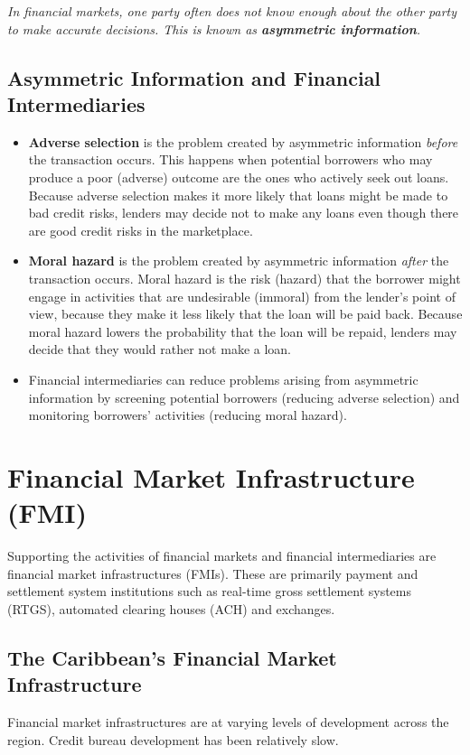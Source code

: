 \textit{In financial markets, one party often does not know enough about the other party to make accurate decisions. This is known as \textbf{asymmetric information}.}

\subsection{Asymmetric Information and Financial Intermediaries}
\begin{itemize}
    \item \textbf{Adverse selection} is the problem created by asymmetric information \emph{before} the transaction occurs. This happens when potential borrowers who may produce a poor (adverse) outcome are the ones who actively seek out loans. Because adverse selection makes it more likely that loans might be made to bad credit risks, lenders may decide not to make any loans even though there are good credit risks in the marketplace.
    \item \textbf{Moral hazard} is the problem created by asymmetric information \emph{after} the transaction occurs. Moral hazard is the risk (hazard) that the borrower might engage in activities that are undesirable (immoral) from the lender’s point of view, because they make it less likely that the loan will be paid back. Because moral hazard lowers the probability that the loan will be repaid, lenders may decide that they would rather not make a loan.
    \item Financial intermediaries can reduce problems arising from asymmetric information by screening potential borrowers (reducing adverse selection) and monitoring borrowers' activities (reducing moral hazard).
\end{itemize}

\section{Financial Market Infrastructure (FMI)}

Supporting the activities of financial markets and financial intermediaries are financial market infrastructures (FMIs). These are primarily payment and settlement system institutions such as real-time gross settlement systems (RTGS), automated clearing houses (ACH) and exchanges.

\subsection{The Caribbean’s Financial Market Infrastructure}
Financial market infrastructures are at varying levels of development across the region. Credit bureau development has been relatively slow.

